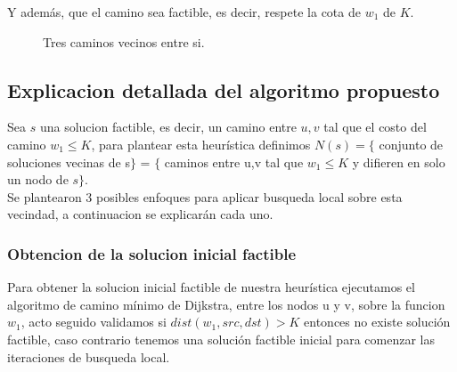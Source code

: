 Y adem\'as, que el camino sea factible, es decir, respete la cota de $w_1$ de $K$.

\begin{figure}[H]
\centering
{}
\caption{Tres caminos vecinos entre si.}
\end{figure}

\subsection{Explicacion detallada del algoritmo propuesto}
Sea $s$ una solucion factible, es decir, un camino entre $u,v$ tal que el costo del camino $w_1 \leq K$,
para plantear esta heur\'istica definimos $N(s) = \{ $ conjunto de soluciones vecinas de s$\}$ = $\{$ caminos entre u,v tal que $w_1 \leq K$ y difieren en solo un nodo de $s\}$.\\

Se plantearon 3 posibles enfoques para aplicar busqueda local sobre esta vecindad, a continuacion se explicar\'an cada uno.

\subsubsection{Obtencion de la solucion inicial factible}

Para obtener la solucion inicial factible de nuestra heur\'istica ejecutamos el algoritmo de camino m\'inimo de Dijkstra, entre los nodos u y v, sobre la funcion $w_1$, acto seguido validamos si $dist(w_1, src, dst) > K$ entonces no existe soluci\'on factible, caso contrario tenemos una soluci\'on factible inicial para comenzar las 
iteraciones de busqueda local.

